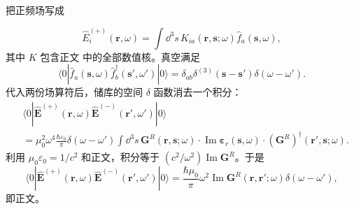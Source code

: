 \begin{derivation}[储库真空态中的电场关联]
把正频场写成

\begin{equation*}
\hat E_i^{(+)}(\mathbf r,\omega)
=\int\dd^3 s\,K_{ia}(\mathbf r,\mathbf s;\omega)
\hat f_a(\mathbf s,\omega),
\end{equation*}
其中 \(K\) 包含正文 中的全部数值核。真空满足
\begin{equation*}
\langle0|\hat f_a(\mathbf s,\omega)
\hat f_b^\dagger(\mathbf s',\omega')|0\rangle
=\delta_{ab}\delta^{(3)}(\mathbf s-\mathbf s')\delta(\omega-\omega').
\end{equation*}
代入两份场算符后，储库的空间 \(\delta\) 函数消去一个积分：
\begin{align*}
&\langle0|\hat{\mathbf E}^{(+)}(\mathbf r,\omega)
\hat{\mathbf E}^{(-)}(\mathbf r',\omega')|0\rangle\\
&=\mu_0^2\omega^4\frac{\hbar\varepsilon_0}{\pi}
\delta(\omega-\omega')
\int\dd^3 s\,
\mathbf G^R(\mathbf r,\mathbf s;\omega)
\cdot\operatorname{Im}\boldsymbol\varepsilon_r(\mathbf s,\omega)
\cdot(\mathbf G^R)^\dagger(\mathbf r',\mathbf s;\omega).
\end{align*}
利用 \(\mu_0\varepsilon_0=1/c^2\) 和正文，积分等于 \((c^2/\omega^2)\operatorname{Im}\mathbf G^R\)。于是
\begin{equation*}
\langle0|\hat{\mathbf E}^{(+)}(\mathbf r,\omega)
\hat{\mathbf E}^{(-)}(\mathbf r',\omega')|0\rangle
=\frac{\hbar\mu_0}{\pi}\omega^2
\operatorname{Im}\mathbf G^R(\mathbf r,\mathbf r';\omega)
\delta(\omega-\omega'),
\end{equation*}
即正文。
\end{derivation}



